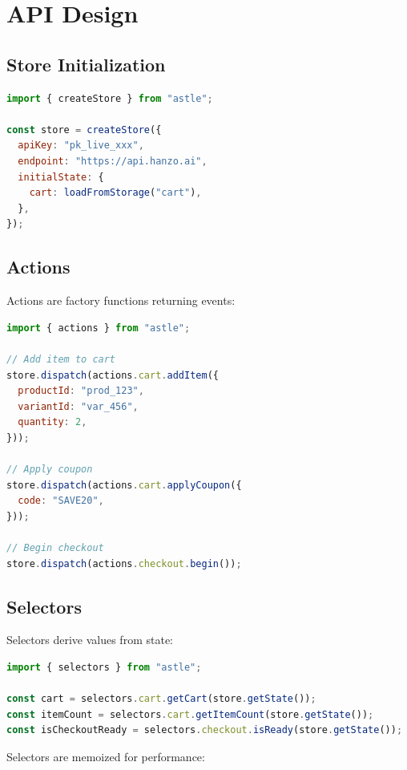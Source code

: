 \section{API Design}


\subsection{Store Initialization}

\begin{lstlisting}[language=JavaScript,caption=Store creation]
import { createStore } from "astle";

const store = createStore({
  apiKey: "pk_live_xxx",
  endpoint: "https://api.hanzo.ai",
  initialState: {
    cart: loadFromStorage("cart"),
  },
});
\end{lstlisting}

\subsection{Actions}

Actions are factory functions returning events:

\begin{lstlisting}[language=JavaScript,caption=Action creators]
import { actions } from "astle";

// Add item to cart
store.dispatch(actions.cart.addItem({
  productId: "prod_123",
  variantId: "var_456",
  quantity: 2,
}));

// Apply coupon
store.dispatch(actions.cart.applyCoupon({
  code: "SAVE20",
}));

// Begin checkout
store.dispatch(actions.checkout.begin());
\end{lstlisting}

\subsection{Selectors}

Selectors derive values from state:

\begin{lstlisting}[language=JavaScript,caption=Selectors]
import { selectors } from "astle";

const cart = selectors.cart.getCart(store.getState());
const itemCount = selectors.cart.getItemCount(store.getState());
const isCheckoutReady = selectors.checkout.isReady(store.getState());
\end{lstlisting}

Selectors are memoized for performance:


